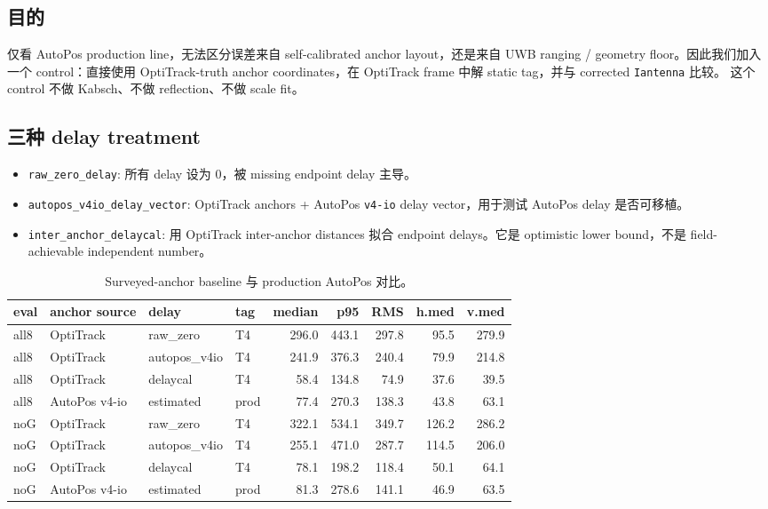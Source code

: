 \documentclass[11pt,a4paper]{article}
\begin{document}
\subsection{目的}
仅看 AutoPos production line，无法区分误差来自 self-calibrated anchor layout，还是来自
UWB ranging / geometry floor。因此我们加入一个 control：直接使用 OptiTrack-truth anchor
coordinates，在 OptiTrack frame 中解 static tag，并与 corrected \texttt{Iantenna} 比较。
这个 control 不做 Kabsch、不做 reflection、不做 scale fit。

\subsection{三种 delay treatment}
\begin{itemize}[leftmargin=1.4em]
  \item \texttt{raw\_zero\_delay}: 所有 delay 设为 0，被 missing endpoint delay 主导。
  \item \texttt{autopos\_v4io\_delay\_vector}: OptiTrack anchors + AutoPos \texttt{v4-io}
        delay vector，用于测试 AutoPos delay 是否可移植。
  \item \texttt{inter\_anchor\_delaycal}: 用 OptiTrack inter-anchor distances 拟合 endpoint
        delays。它是 optimistic lower bound，不是 field-achievable independent number。
\end{itemize}

\begin{table}[h]
\centering
\caption{Surveyed-anchor baseline 与 production AutoPos 对比。}
\small
\begin{tabular}{llllrrrrr}
\toprule
eval & anchor source & delay & tag & median & p95 & RMS & h.med & v.med \\
\midrule
all8 & OptiTrack & raw\_zero      & T4 & 296.0 & 443.1 & 297.8 & 95.5 & 279.9 \\
all8 & OptiTrack & autopos\_v4io  & T4 & 241.9 & 376.3 & 240.4 & 79.9 & 214.8 \\
all8 & OptiTrack & delaycal       & T4 & 58.4  & 134.8 & 74.9  & 37.6 & 39.5 \\
all8 & AutoPos v4-io & estimated  & prod & 77.4 & 270.3 & 138.3 & 43.8 & 63.1 \\
\midrule
noG  & OptiTrack & raw\_zero      & T4 & 322.1 & 534.1 & 349.7 & 126.2 & 286.2 \\
noG  & OptiTrack & autopos\_v4io  & T4 & 255.1 & 471.0 & 287.7 & 114.5 & 206.0 \\
noG  & OptiTrack & delaycal       & T4 & 78.1  & 198.2 & 118.4 & 50.1  & 64.1 \\
noG  & AutoPos v4-io & estimated  & prod & 81.3 & 278.6 & 141.1 & 46.9 & 63.5 \\
\bottomrule
\end{tabular}
\end{table}
\end{document}
